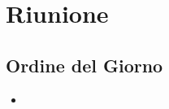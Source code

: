 \section{Riunione}
\subsection{Ordine del Giorno}
\begin{itemize}
	\item 

\end{itemize}

\subsection{}
\subsubsection{}


\clearpage
